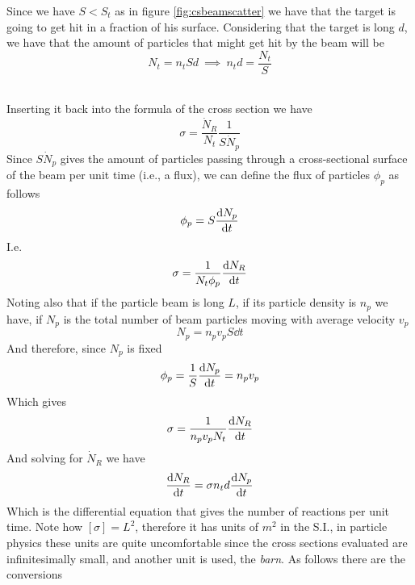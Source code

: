 \documentclass[../qm.tex]{subfiles}
\begin{document}
\begin{minipage}{0.45\linewidth}
	Since we have $S<S_t$ as in figure \eqref{fig:csbeamscatter} we have that the target is going to get hit in a fraction of his surface. Considering that the target is long $d$, we have that the amount of particles that might get hit by the beam will be
	\begin{equation}
		N_t=n_tSd\ \implies\ n_td=\frac{N_t}{S}
		\label{eq:ntbeamcs}
	\end{equation}
\end{minipage}\\
Inserting it back into the formula of the cross section we have
\begin{equation}
	\sigma=\frac{\dot{N}_R}{N_t}\frac{1}{S\dot{N}_p}
	\label{eq:sigmatottarpar}
\end{equation}
Since $S\dot{N}_p$ gives the amount of particles passing through a cross-sectional surface of the beam per unit time (i.e., a flux), we can define the flux of particles $\phi_p$ as follows
\begin{equation}
	\phi_p=S\derivative{N_p}{t}
	\label{eq:particlefluxscat}
\end{equation}
I.e.
\begin{equation}
	\sigma=\frac{1}{N_t\phi_p}\derivative{N_R}{t}
	\label{eq:sigmafluxscat}
\end{equation}
Noting also that if the particle beam is long $L$, if its particle density is $n_p$ we have, if $N_p$ is the total number of beam particles moving with average velocity $v_p$
\begin{equation*}
	N_p=n_pv_pS\dd t
\end{equation*}
And therefore, since $N_p$ is fixed
\begin{equation*}
	\phi_p=\frac{1}{S}\dv{N_p}{t}=n_pv_p
\end{equation*}
Which gives
\begin{equation*}
	\sigma=\frac{1}{n_pv_pN_t}\dv{N_R}{t}
\end{equation*}
And solving for $\dot{N}_R$ we have
\begin{equation}
	\dv{N_R}{t}=\sigma n_td\dv{N_p}{t}
	\label{eq:reactionperunittimescat}
\end{equation}
Which is the differential equation that gives the number of reactions per unit time. Note how $[\sigma]=L^2$, therefore it has units of $m^2$ in the S.I., in particle physics these units are quite uncomfortable since the cross sections evaluated are infinitesimally small, and another unit is used, the \emph{barn}. As follows there are the conversions
\end{document}
